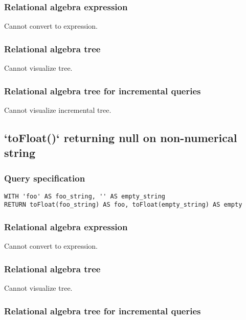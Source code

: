\subsubsection*{Relational algebra expression}

Cannot convert to expression.

\subsubsection*{Relational algebra tree}

Cannot visualize tree.

\subsubsection*{Relational algebra tree for incremental queries}

Cannot visualize incremental tree.

\subsection{`toFloat()` returning null on non-numerical string}

\subsubsection*{Query specification}

\begin{lstlisting}
WITH 'foo' AS foo_string, '' AS empty_string
RETURN toFloat(foo_string) AS foo, toFloat(empty_string) AS empty
\end{lstlisting}

\subsubsection*{Relational algebra expression}

Cannot convert to expression.

\subsubsection*{Relational algebra tree}

Cannot visualize tree.

\subsubsection*{Relational algebra tree for incremental queries}

